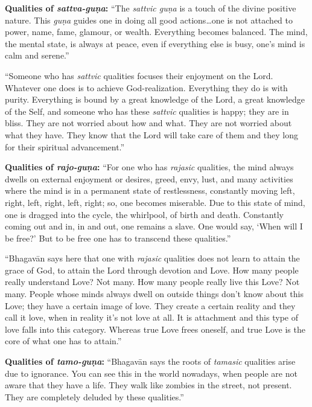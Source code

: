 \documentclass[12pt, twoside, openright]{memoir}
\begin{document}
\textbf{Qualities of \textit{sattva-guṇa}:} \enquote{The \textit{sattvic guṇa} is a touch of the divine positive nature. This \textit{guṇa} guides one in doing all good actions\ldots one is not attached to power, name, fame, glamour, or wealth. Everything becomes balanced. The mind, the mental state, is always at peace, even if everything else is busy, one’s mind is calm and serene.}

\enquote{Someone who has \textit{sattvic} qualities focuses their enjoyment on the Lord. Whatever one does is to achieve God-realization. Everything they do is with purity. Everything is bound by a great knowledge of the Lord, a great knowledge of the Self, and someone who has these \textit{sattvic} qualities is happy; they are in bliss. They are not worried about how and what. They are not worried about what they have. They know that the Lord will take care of them and they long for their spiritual advancement.}

\textbf{Qualities of \textit{rajo-guṇa}:} \enquote{For one who has \textit{rajasic} qualities, the mind always dwells on external enjoyment or desires, greed, envy, lust, and many activities where the mind is in a permanent state of restlessness, constantly moving left, right, left, right, left, right; so, one becomes miserable. Due to this state of mind, one is dragged into the cycle, the whirlpool, of birth and death. Constantly coming out and in, in and out, one remains a slave. One would say, \enquote{When will I be free?} But to be free one has to transcend these qualities.}

\enquote{Bhagavān says here that one with \textit{rajasic} qualities does not learn to attain the grace of God, to attain the Lord through devotion and Love. How many people really understand Love? Not many. How many people really live this Love? Not many. People whose minds always dwell on outside things don’t know about this Love; they have a certain image of love. They create a certain reality and they call it love, when in reality it’s not love at all. It is attachment and this type of love falls into this category. Whereas true Love frees oneself, and true Love is the core of what one has to attain.}

\textbf{Qualities of \textit{tamo-guṇa}:} \enquote{Bhagavān says the roots of \textit{tamasic} qualities arise due to ignorance. You can see this in the world nowadays, when people are not aware that they have a life. They walk like zombies in the street, not present. They are completely deluded by these qualities.}
\end{document}
